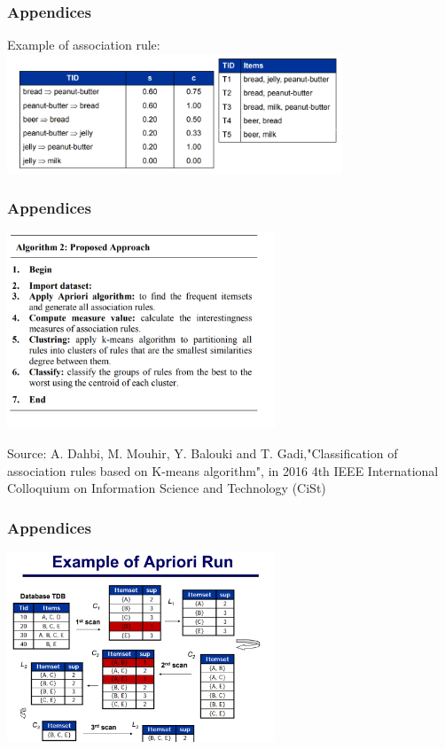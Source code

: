 \documentclass{beamer}
\begin{document}
\begin{frame}
\frametitle{Appendices}
Example of association rule: \\
	\includegraphics[width=100mm]{as.png}
\end{frame}
\begin{frame}
\frametitle{Appendices}
\includegraphics[width=80mm]{km.png}

{\tiny Source:  A. {Dahbi}, M. {Mouhir}, Y. {Balouki} and T. {Gadi},"Classification of association rules based on K-means algorithm", in 2016 4th IEEE International Colloquium on Information Science and Technology (CiSt)}
\end{frame}
\begin{frame}
\frametitle{Appendices}

\includegraphics[width=80mm]{api.png}
\end{frame}
\end{document}
